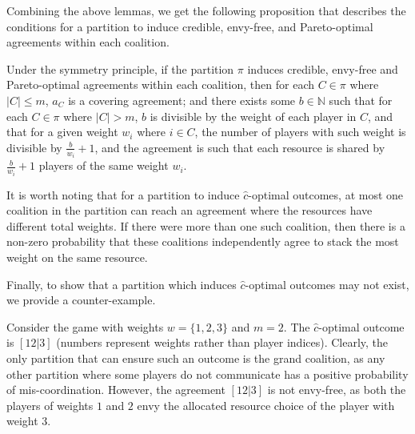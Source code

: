 Combining the above lemmas, we get the following proposition that describes the conditions for a partition to induce credible, envy-free, and Pareto-optimal agreements within each coalition.

\begin{proposition}
    Under the symmetry principle, if the partition $\pi$ induces credible, envy-free and Pareto-optimal agreements within each coalition, then for each $C \in \pi$ where $|C| \leq m$, $a_C$ is a covering agreement; and there exists some $b \in \mathbb{N}$ such that for each $C \in \pi$ where $|C| > m$, $b$ is divisible by the weight of each player in $C$, and that for a given weight $w_i$ where $i \in C$, the number of players with such weight is divisible by $\frac{b}{w_i} + 1$, and the agreement is such that each resource is shared by $\frac{b}{w_i} + 1$ players of the same weight $w_i$.
\end{proposition}

It is worth noting that for a partition to induce $\hat c$-optimal outcomes, at most one coalition in the partition can reach an agreement where the resources have different total weights. If there were more than one such coalition, then there is a non-zero probability that these coalitions independently agree to stack the most weight on the same resource.

Finally, to show that a partition which induces $\hat c$-optimal outcomes may not exist, we provide a counter-example.

\begin{example}
    Consider the game with weights $w = \{1, 2, 3\}$ and $m = 2$. The $\hat c$-optimal outcome is $[12|3]$ (numbers represent weights rather than player indices). Clearly, the only partition that can ensure such an outcome is the grand coalition, as any other partition where some players do not communicate has a positive probability of mis-coordination. However, the agreement $[12|3]$ is not envy-free, as both the players of weights $1$ and $2$ envy the allocated resource choice of the player with weight $3$. 
\end{example}



    
